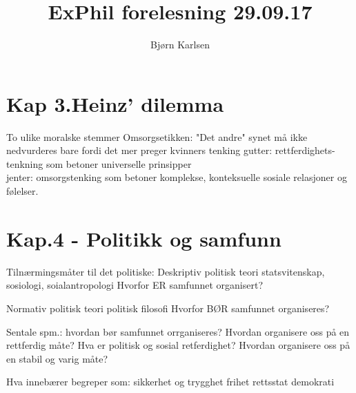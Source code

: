 \documentclass[11pt]{article}
\title{\textbf{ExPhil forelesning 29.09.17}}
\author{Bjørn Karlsen}
\date{}
\begin{document}
\maketitle

\section{Kap 3.Heinz' dilemma}
To ulike moralske stemmer
Omsorgsetikken: "Det andre" synet må ikke nedvurderes bare fordi det mer preger kvinners tenking
gutter: rettferdighets-\\tenkning som betoner universelle prinsipper\\
jenter: omsorgstenking som betoner komplekse, konteksuelle sosiale relasjoner og følelser.

\section{Kap.4 - Politikk og samfunn}
Tilnærmingsmåter til det politiske:
Deskriptiv politisk teori
statsvitenskap, sosiologi, soialantropologi
Hvorfor ER samfunnet organisert?

Normativ politisk teori
politisk filosofi
Hvorfor BØR samfunnet organiseres?

Sentale spm.:
hvordan bør samfunnet orrganiseres?
Hvordan organisere oss på en rettferdig måte?
Hva er politisk og sosial retferdighet?
Hvordan organisere oss på en stabil og varig måte?

Hva innebærer begreper som:
sikkerhet og trygghet
frihet
rettsstat
demokrati
\end{document}
